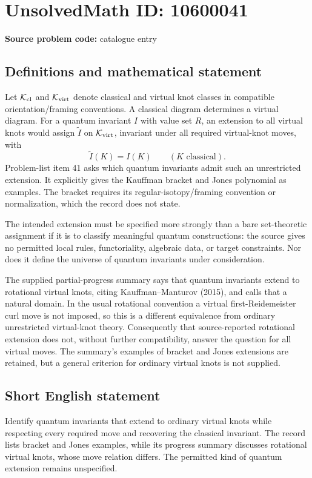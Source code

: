 \documentclass[11pt]{article}
\begin{document}
\section*{UnsolvedMath ID: 10600041}
\textbf{Source problem code:} catalogue entry
\subsection{Definitions and mathematical statement}
Let \(\mathcal K_{\rm cl}\) and \(\mathcal K_{\rm virt}\) denote classical and virtual knot classes in compatible orientation/framing conventions. A classical diagram determines a virtual diagram. For a quantum invariant \(I\) with value set \(R\), an extension to all virtual knots would assign \(\widetilde I\) on \(\mathcal K_{\rm virt}\), invariant under all required virtual-knot moves, with
\[
 \widetilde I(K)=I(K)\qquad(K\text{ classical}).
\]
Problem-list item 41 asks which quantum invariants admit such an unrestricted extension. It explicitly gives the Kauffman bracket and Jones polynomial as examples. The bracket requires its regular-isotopy/framing convention or normalization, which the record does not state.

The intended extension must be specified more strongly than a bare set-theoretic assignment if it is to classify meaningful quantum constructions: the source gives no permitted local rules, functoriality, algebraic data, or target constraints. Nor does it define the universe of quantum invariants under consideration.

The supplied partial-progress summary says that quantum invariants extend to rotational virtual knots, citing Kauffman--Manturov (2015), and calls that a natural domain. In the usual rotational convention a virtual first-Reidemeister curl move is not imposed, so this is a different equivalence from ordinary unrestricted virtual-knot theory. Consequently that source-reported rotational extension does not, without further compatibility, answer the question for all virtual moves. The summary's examples of bracket and Jones extensions are retained, but a general criterion for ordinary virtual knots is not supplied.
\subsection{Short English statement}
Identify quantum invariants that extend to ordinary virtual knots while respecting every required move and recovering the classical invariant. The record lists bracket and Jones examples, while its progress summary discusses rotational virtual knots, whose move relation differs. The permitted kind of quantum extension remains unspecified.
\end{document}
